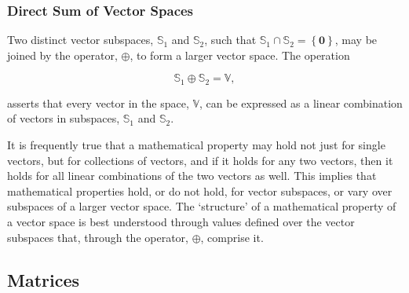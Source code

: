 \documentclass[12pt, twoside, draft]{article}
\begin{document}
\subsubsection{Direct Sum of Vector Spaces}
Two distinct vector subspaces, $\mathbb{S}_1$ and $\mathbb{S}_2$, such that $\mathbb{S}_1 \cap \mathbb{S}_2 = \left\{\mathbf{0}\right\}$, may be joined by the operator, $\oplus$, to form a larger vector space.  The operation

\begin{equation}\label{eq:def_oplus}
\mathbb{S}_1 \oplus \mathbb{S}_2 = \mathbb{V},
\end{equation}

asserts that every vector in the space, $\mathbb{V}$, can be expressed as a linear combination of vectors in subspaces,
$\mathbb{S}_1$ and $\mathbb{S}_2$.

It is frequently true that a mathematical property may hold not just for single vectors, but for collections of vectors, and if it holds for any two vectors, then it holds for all linear combinations of the two vectors as well.  This implies that mathematical properties hold, or do not hold, for vector subspaces, or vary over subspaces of a larger vector space.  The `structure' of a mathematical property of a vector space is best understood through values defined over the vector subspaces that, through the operator, $\oplus$, comprise it.

\subsection{Matrices}\label{matrices}
\end{document}
